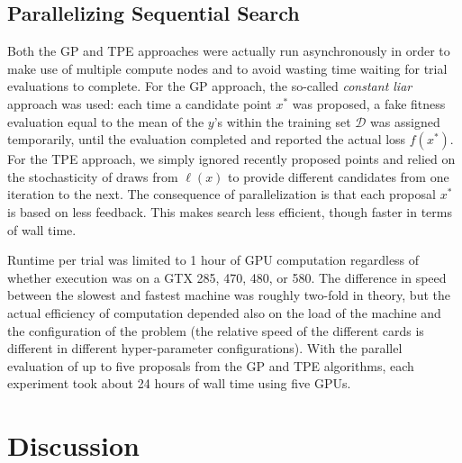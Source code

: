 \documentclass{article}
\newcommand{\vs}[1]{\vspace*{-#1mm}}
\newcommand{\Bs}{\vs{2}}
\newcommand{\as}{\vs{1}}
\newcommand{\Bss}{\vs{1}}
\newcommand{\ass}{\vs{0.7}}
\begin{document}
\Bss
\subsection{Parallelizing Sequential Search}
\ass

Both the GP and TPE approaches were actually run asynchronously
in order to make use of multiple compute nodes and to avoid wasting time
waiting for trial evaluations to complete.
For the GP approach, the so-called
{\it constant liar} approach was used: each time a candidate point $x^*$
was proposed, a fake fitness evaluation equal to the mean of the $y$'s
within the training set $\mathcal{D}$ was assigned temporarily, until the
evaluation completed and reported the actual loss $f(x^*)$.
For the TPE approach, we simply ignored recently proposed points and relied
on the stochasticity of draws from $\ell(x)$ to provide
different candidates from one iteration to the next.
The consequence of parallelization is that each proposal $x^*$ is based on
less feedback. This makes search less efficient, though faster in terms of
wall time.


Runtime per trial was limited to 1 hour of GPU computation regardless of whether execution was on a GTX 285, 470, 480, or 580. The difference in speed between the slowest and fastest machine was roughly two-fold in theory, but the actual efficiency of computation depended also on the load of the machine and the configuration of the problem (the relative speed of the different cards is different in different hyper-parameter configurations).
With the parallel evaluation of up to five proposals from the GP and TPE algorithms, each experiment took about 24 hours of wall time using five GPUs.


\Bs
\section{Discussion}
\label{sec:discussion}
\as
\end{document}
